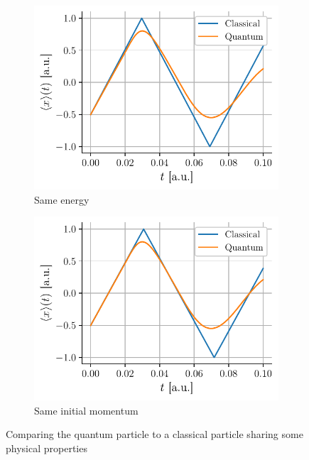 \begin{figure}[h]
    \centering
    \begin{subfigure}{0.48\linewidth}
        \centering
        \includegraphics[width=\linewidth]{figures/i_classical_vs_quantum_energy.pdf}
        \caption{Same energy}
        \label{fig:i_classical_vs_quantum_energy}
    \end{subfigure}
    \begin{subfigure}{0.48\linewidth}
        \centering
        \includegraphics[width=\linewidth]{figures/i_classical_vs_quantum_momentum.pdf}
        \caption{Same initial momentum}
        \label{fig:i_classical_vs_quantum_momentum}
    \end{subfigure}
    \caption{Comparing the quantum particle to a classical particle sharing some physical properties}
    \label{fig:i_classical_vs_quantum}
\end{figure}

